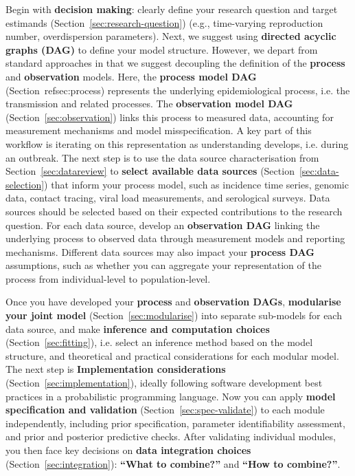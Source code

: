 \documentclass{article}
\begin{document}
Begin with \textbf{decision making}: clearly define your research question and target estimands (Section~\ref{sec:research-question}) (e.g., time-varying reproduction number, overdispersion parameters).
Next, we suggest using \textbf{directed acyclic graphs (DAG)}  to define your model structure. However, we depart from standard approaches in that we suggest decoupling the definition of the \textbf{process} and \textbf{observation} models.
Here, the \textbf{process model DAG} (Section~ref{sec:process}) represents the underlying epidemiological process, i.e. the transmission and related processes.
The \textbf{observation model DAG} (Section~\ref{sec:observation}) links this process to measured data, accounting for measurement mechanisms and model misspecification.
A key part of this workflow is iterating on this representation as understanding develops, i.e. during an outbreak.
The next step is to use the data source characterisation from Section~\ref{sec:datareview} to \textbf{select available data sources} (Section~\ref{sec:data-selection}) that inform your process model, such as incidence time series, genomic data, contact tracing, viral load measurements, and serological surveys.
Data sources should be selected based on their expected contributions to the research question.
For each data source, develop an \textbf{observation DAG} linking the underlying process to observed data through measurement models and reporting mechanisms.
Different data sources may also impact your \textbf{process DAG} assumptions, such as whether you can aggregate your representation of the process from individual-level to population-level.

Once you have developed your \textbf{process} and \textbf{observation DAGs}, \textbf{modularise your joint model} (Section~\ref{sec:modularise}) into separate sub-models for each data source, and make \textbf{inference and computation choices} (Section~\ref{sec:fitting}), i.e. select an inference method based on the model structure, and theoretical and practical considerations for each modular model.
The next step is \textbf{Implementation considerations} (Section~\ref{sec:implementation}), ideally following software development best practices in a probabilistic programming language.
Now you can apply \textbf{model specification and validation} (Section~\ref{sec:spec-validate}) to each module independently, including prior specification, parameter identifiability assessment, and prior and posterior predictive checks.
After validating individual modules, you then face key decisions on \textbf{data integration choices} (Section~\ref{sec:integration}): \textbf{``What to combine?''} and \textbf{``How to combine?''}.
\end{document}
